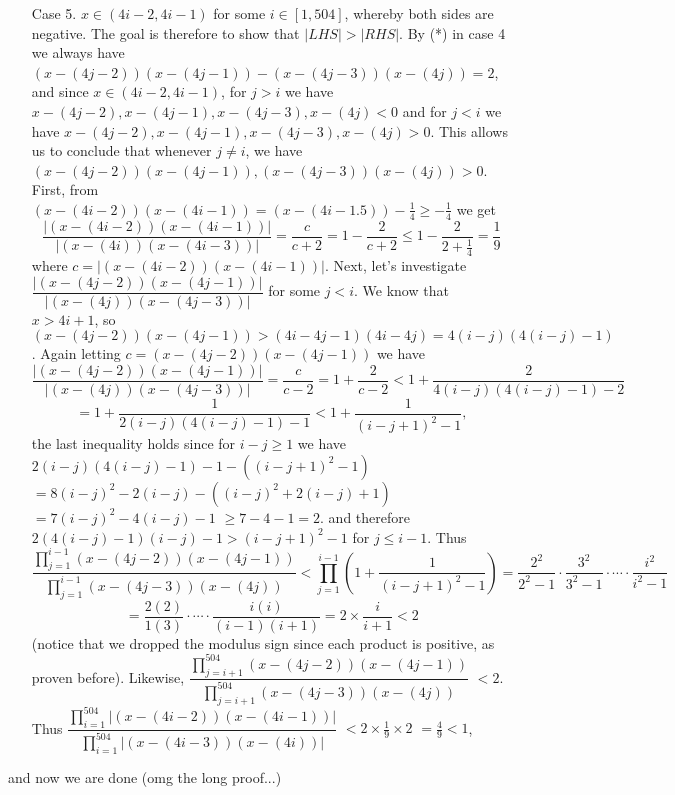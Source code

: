 \documentclass[11pt,a4paper]{article}
\begin{document}
\begin{itemize}
\begin{itemize}
\item [Case 5.]
$x\in (4i-2, 4i-1)$ for some $i\in [1, 504]$, whereby both sides are negative. 
The goal is therefore to show that $|LHS|>|RHS|$.  
By (*) in case 4 we always have 
$(x-(4j-2))(x-(4j-1))-(x-(4j-3))(x-(4j))=2$, 
and since $x\in (4i-2, 4i-1)$, for $j > i$ we have $x-(4j-2), x-(4j-1), x-(4j-3), x-(4j)<0$ and 
for $j<i$ we have $x-(4j-2), x-(4j-1), x-(4j-3), x-(4j)>0$. 
This allows us to conclude that whenever $j\neq i$, we have 
$(x-(4j-2))(x-(4j-1)), (x-(4j-3))(x-(4j))>0$. 
First, from $(x-(4i-2))(x-(4i-1))=(x-(4i-1.5))-\frac 14\ge -\frac 14$ we get 
\[\frac{|(x-(4i-2))(x-(4i-1))|}{|(x-(4i))(x-(4i-3))|}=\frac{c}{c+2}=1-\frac{2}{c+2}\le 1-\frac 2{2+\frac 14}=\frac 19\] 
where $c=|(x-(4i-2))(x-(4i-1))|.$
Next, let's investigate $\dfrac{|(x-(4j-2))(x-(4j-1))|}{|(x-(4j))(x-(4j-3))|}$ 
for some $j<i$. 
We know that $x>4i+1$, so 
$(x-(4j-2))(x-(4j-1))> (4i-4j-1)(4i-4j)=4(i-j)(4(i-j)-1)$. 
Again letting $c= (x-(4j-2))(x-(4j-1))$ we have 
\[\frac{|(x-(4j-2))(x-(4j-1))|}{|(x-(4j))(x-(4j-3))|}
=\frac{c}{c-2}
=1+\frac 2{c-2}
<1+\frac 2{4(i-j)(4(i-j)-1)-2}\]
\[=1+\frac 1{2(i-j)(4(i-j)-1)-1}
<1+\frac 1{(i-j+1)^2-1},\]
the last inequality holds since for $i-j\ge 1$ we have 
$2(i-j)(4(i-j)-1)-1-((i-j+1)^2-1)$
$=8(i-j)^2-2(i-j)-((i-j)^2+2(i-j)+1)$
$=7(i-j)^2-4(i-j)-1$
$\ge 7-4-1=2$. 
and therefore $2(4(i-j)-1)(i-j)-1>(i-j+1)^2-1$ for $j\le i-1$.
Thus 
\[\dfrac{\displaystyle\prod_{j=1}^{i-1} (x-(4j-2))(x-(4j-1))}{\displaystyle\prod_{j=1}^{i-1} (x-(4j-3))(x-(4j))}
<\displaystyle\prod_{j=1}^{i-1}\left(1+\frac 1{(i-j+1)^2-1}\right)
=\frac{2^2}{2^2-1}\cdot\frac{3^2}{3^2-1}\cdot\cdots\cdot \frac{i^2}{i^2-1}\]
\[=\frac{2(2)}{1(3)}\cdot\cdots\cdot \frac{i(i)}{(i-1)(i+1)}
=2\times\frac{i}{i+1}<2\]
(notice that we dropped the modulus sign since each product is positive, as proven before).  
Likewise, $\dfrac{\displaystyle\prod_{j=i+1}^{504} (x-(4j-2))(x-(4j-1))}{\displaystyle\prod_{j=i+1}^{504} (x-(4j-3))(x-(4j))}$
$<2$. 
Thus $\dfrac{\displaystyle\prod_{i=1}^{504} |(x-(4i-2))(x-(4i-1))|}{\displaystyle\prod_{i=1}^{504} |(x-(4i-3))(x-(4i))|}$
$<2\times \frac{1}{9}\times 2$
$=\frac 49<1$, 

\end{itemize}
and now we are done (omg the long proof...)

\end{itemize}
\end{document}
